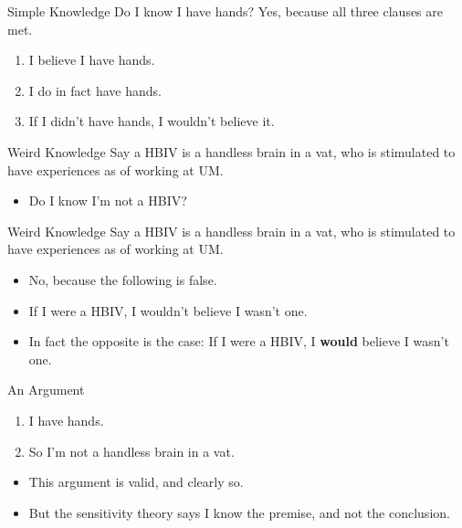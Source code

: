 \documentclass[
  17pt,
  letterpaper,
  ignorenonframetext,
  aspectratio=169,
]{beamer}
\providecommand{\tightlist}{%
  \setlength{\itemsep}{0pt}\setlength{\parskip}{0pt}}\usepackage{longtable,booktabs,array}
\begin{document}
\begin{frame}{Simple Knowledge}
\protect\hypertarget{simple-knowledge}{}
Do I know I have hands? Yes, because all three clauses are met.

\begin{enumerate}[<+->]
\tightlist
\item
  I believe I have hands.
\item
  I do in fact have hands.
\item
  If I didn't have hands, I wouldn't believe it.
\end{enumerate}
\end{frame}

\begin{frame}{Weird Knowledge}
\protect\hypertarget{weird-knowledge}{}
Say a HBIV is a handless brain in a vat, who is stimulated to have
experiences as of working at UM.

\begin{itemize}[<+->]
\tightlist
\item
  Do I know I'm not a HBIV?
\end{itemize}
\end{frame}

\begin{frame}{Weird Knowledge}
\protect\hypertarget{weird-knowledge-1}{}
Say a HBIV is a handless brain in a vat, who is stimulated to have
experiences as of working at UM.

\begin{itemize}[<+->]
\tightlist
\item
  No, because the following is false.
\item
  If I were a HBIV, I wouldn't believe I wasn't one.
\item
  In fact the opposite is the case: If I were a HBIV, I \textbf{would}
  believe I wasn't one.
\end{itemize}
\end{frame}

\begin{frame}{An Argument}
\protect\hypertarget{an-argument}{}
\begin{enumerate}[<+->]
\tightlist
\item
  I have hands.
\item
  So I'm not a handless brain in a vat.
\end{enumerate}

\begin{itemize}[<+->]
\tightlist
\item
  This argument is valid, and clearly so.
\item
  But the sensitivity theory says I know the premise, and not the
  conclusion.
\end{itemize}
\end{frame}
\end{document}
